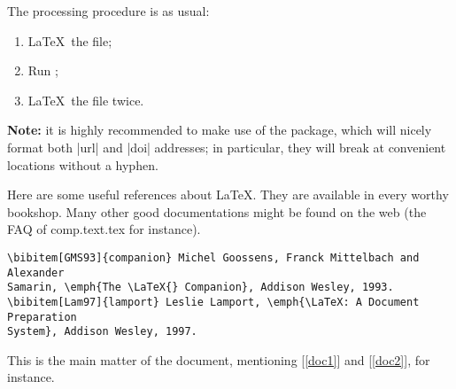  The processing procedure is as usual:
 \begin{enumerate}
  \item \LaTeX\ the file;
  \item Run \btx;
  \item \LaTeX\ the file twice.
 \end{enumerate}

 \noindent
 \textbf{Note:} it is highly recommended to make use of the 
 package, which will nicely format both |url| and |doi| addresses; in particular,
 they will break at convenient locations without a hyphen.




Here are some useful references about \LaTeX. They are
available in every worthy bookshop. Many other good documentations
might be found on the web (the FAQ of \textsf{comp.text.tex} for
instance).


\begin{verbatim}
\bibitem[GMS93]{companion} Michel Goossens, Franck Mittelbach and Alexander
Samarin, \emph{The \LaTeX{} Companion}, Addison Wesley, 1993.
\bibitem[Lam97]{lamport} Leslie Lamport, \emph{\LaTeX: A Document Preparation
System}, Addison Wesley, 1997.
\end{verbatim}

This is the main matter of the document, mentioning
[\ref{doc1}] and [\ref{doc2}], for instance.


